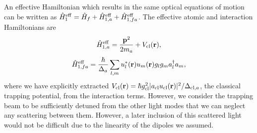 An effective Hamiltonian which results in the same optical equations
of motion can be written as
$\hat{H}^\mathrm{eff}_1 = \hat{H}_f + \hat{H}^\mathrm{eff}_{1,a} +
\hat{H}^\mathrm{eff}_{1,fa}$. The effective atomic and interaction
Hamiltonians  are
\begin{equation}
  \hat{H}^\mathrm{eff}_{1,a} = \frac{\mathbf{p}^2}{2 m_a} + V_\mathrm{cl}(\mathbf{r}),
\end{equation}
\begin{equation}
  \hat{H}^\mathrm{eff}_{1,fa} = \frac{\hbar}{\Delta_a} \sum_{l,m}
  u_l^*(\mathbf{r}) u_m(\mathbf{r}) g_l g_m a^\dagger_l a_m,
\end{equation}
where we have explicitly extracted
$V_\mathrm{cl}(\mathbf{r}) = \hbar g_\mathrm{cl}^2 |a_\mathrm{cl}
u_\mathrm{cl}(\mathbf{r})|^2 / \Delta_{\mathrm{cl},a}$, the classical
trapping potential, from the interaction terms. However, we consider
the trapping beam to be sufficiently detuned from the other light
modes that we can neglect any scattering between them. However, a
later inclusion of this scattered light would not be difficult due to
the linearity of the dipoles we assumed.
